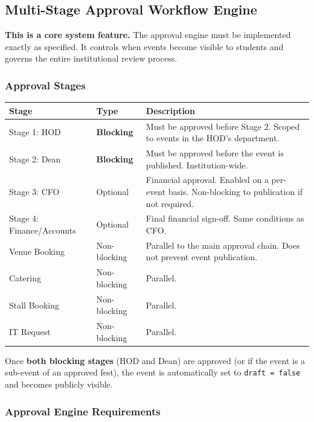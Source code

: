 \documentclass[12pt,a4paper]{article}
\begin{document}
\subsection{Multi-Stage Approval Workflow Engine}

\begin{reqbox}
\textbf{This is a core system feature.} The approval engine must be implemented exactly as specified. It controls when events become visible to students and governs the entire institutional review process.
\end{reqbox}

\vspace{0.4cm}

\subsubsection{Approval Stages}

\begin{tabularx}{\textwidth}{L{3cm} C{2cm} X}
\toprule
{}
\textbf{Stage} & \textbf{Type} & \textbf{Description} \\
\midrule
Stage 1: HOD & \textbf{Blocking} & Must be approved before Stage 2. Scoped to events in the HOD's department. \\
Stage 2: Dean & \textbf{Blocking} & Must be approved before the event is published. Institution-wide. \\
Stage 3: CFO & Optional & Financial approval. Enabled on a per-event basis. Non-blocking to publication if not required. \\
Stage 4: Finance/Accounts & Optional & Final financial sign-off. Same conditions as CFO. \\
Venue Booking & Non-blocking & Parallel to the main approval chain. Does not prevent event publication. \\
Catering & Non-blocking & Parallel. \\
Stall Booking & Non-blocking & Parallel. \\
IT Request & Non-blocking & Parallel. \\
\bottomrule
\end{tabularx}

\vspace{0.3cm}
Once \textbf{both blocking stages} (HOD and Dean) are approved (or if the event is a sub-event of an approved fest), the event is automatically set to \texttt{draft = false} and becomes publicly visible.

\subsubsection{Approval Engine Requirements}
\end{document}
